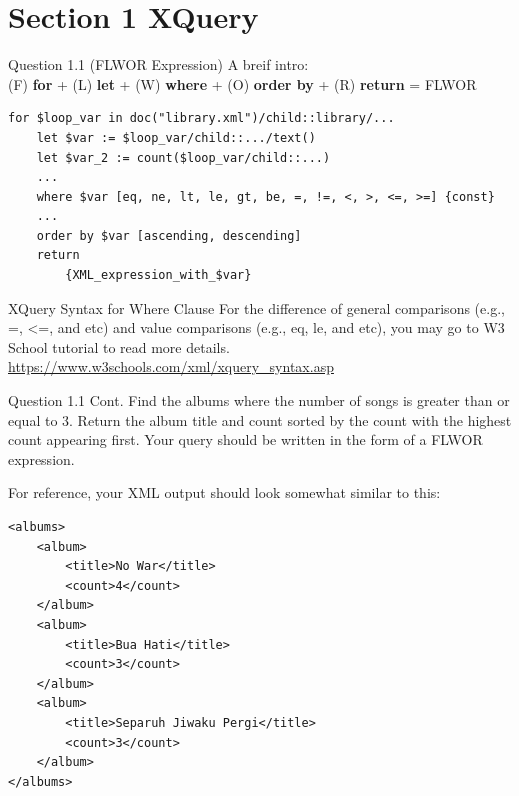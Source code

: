 \section*{Section 1 XQuery}

\begin{frame}[fragile]{Question 1.1 (FLWOR Expression)}
A breif intro:\\\vspace{10pt}
(F) \textbf{for} + (L) \textbf{let} + (W) \textbf{where} + (O) \textbf{order by} + (R) \textbf{return} = FLWOR\\\vspace{10pt}

\begin{lstlisting}[style=xml-small-nomargin]
for $loop_var in doc("library.xml")/child::library/...
	let $var := $loop_var/child::.../text()
	let $var_2 := count($loop_var/child::...)
	...
	where $var [eq, ne, lt, le, gt, be, =, !=, <, >, <=, >=] {const}
	...
	order by $var [ascending, descending]
	return 
		{XML_expression_with_$var}
\end{lstlisting}

\begin{block}{XQuery Syntax for Where Clause}
	For the difference of general comparisons (e.g., =, <=, and etc) and value comparisons (e.g., eq, le, and etc), you may go to W3 School tutorial to read more details. \\
	\url{https://www.w3schools.com/xml/xquery_syntax.asp}
\end{block}
\end{frame}

\begin{frame}[fragile]{Question 1.1 Cont.}
Find the albums where the number of songs is greater than or equal to 3. Return the album title and count sorted by the count with the highest count appearing first. Your query should be written in the form of a FLWOR expression.\\\vspace{10pt}

For reference, your XML output should look somewhat similar to this:\\

\begin{lstlisting}[style=xml-small-nomargin]
<albums>
	<album>
		<title>No War</title>
		<count>4</count>
	</album>
	<album>
		<title>Bua Hati</title>
		<count>3</count>
	</album>
	<album>
		<title>Separuh Jiwaku Pergi</title>
		<count>3</count>
	</album>
</albums>
\end{lstlisting}
\end{frame}

